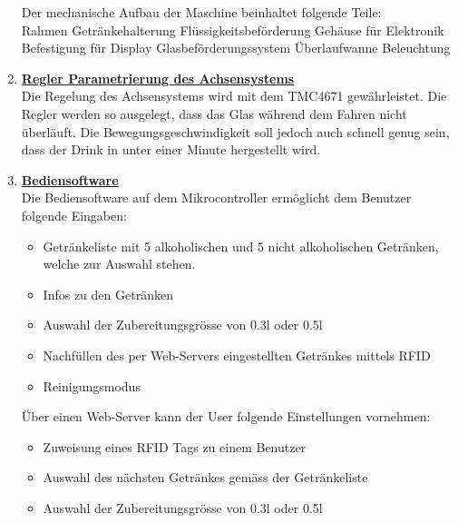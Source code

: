 \begin{enumerate}
Der mechanische Aufbau der Maschine beinhaltet folgende Teile: \\

\textbullet Rahmen \newline
\textbullet Getränkehalterung \newline
\textbullet Flüssigkeitsbeförderung \newline
\textbullet Gehäuse für Elektronik \newline
\textbullet Befestigung für Display \newline
\textbullet Glasbeförderungssystem \newline
\textbullet Überlaufwanne \newline
\textbullet Beleuchtung\\
\newpage

\item \underline{\textbf{Regler Parametrierung des Achsensystems}}\mbox{}\\

Die Regelung des Achsensystems wird mit dem TMC4671 gewährleistet. Die Regler werden so ausgelegt, dass das Glas während dem Fahren nicht überläuft. Die Bewegungsgeschwindigkeit soll jedoch auch schnell genug sein, dass der Drink in unter einer Minute hergestellt wird.\\

\item \underline{\textbf{Bediensoftware}}\mbox{}\\

Die Bediensoftware auf dem Mikrocontroller ermöglicht dem Benutzer folgende Eingaben:\\
\begin{itemize}

\item Getränkeliste mit 5 alkoholischen und 5 nicht alkoholischen Getränken, welche zur Auswahl stehen.
\item Infos zu den Getränken
\item Auswahl der Zubereitungsgrösse von 0.3l oder 0.5l
\item Nachfüllen des per Web-Servers eingestellten Getränkes mittels RFID
\item Reinigungsmodus\\
\end{itemize}

Über einen Web-Server kann der User folgende Einstellungen vornehmen: \\

\begin{itemize}
\item Zuweisung eines RFID Tags zu einem Benutzer
\item Auswahl des nächsten Getränkes gemäss der Getränkeliste
\item Auswahl der Zubereitungsgrösse von 0.3l oder 0.5l\\ 
\end{itemize} 


\end{enumerate}
